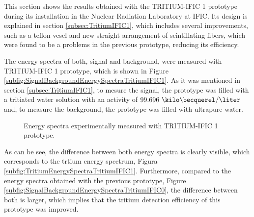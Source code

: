 This section shows the results obtained with the TRITIUM-IFIC 1 prototype  during its installation in the Nuclear Radiation Laboratory at IFIC. Its design is explained in section \ref{subsec:TritiumIFIC1}, which includes several improvements, such as a teflon vesel and new straight arrangement of scintillating fibers, which were found to be a problems in the previous prototype, reducing its efficiency.

The energy spectra of both, signal and background, were measured with TRITIUM-IFIC 1 prototype, which is shown in Figure \ref{subfig:SignalBackgroundEnergySpectraTritiumIFIC1}. As it was mentioned in section \ref{subsec:TritiumIFIC1}, to mesure the signal, the prototype was filled with a tritiated water solution with an activity of $99.696~\kilo\becquerel/\liter$ and, to measure the background, the prototype was filled with ultrapure water.

\begin{figure}[h]
 \centering
   \newline
 \caption{Energy spectra experimentally measured with TRITIUM-IFIC 1 prototype.}
 \label{fig:EnergySpectraTRITIUMIFIC1}
\end{figure}


As can be see, the difference between both energy spectra is clearly visible, which corresponds to the trtium energy spectrum, Figura \ref{subfig:TritiumEnergySpectraTritiumIFIC1}. Furthermore, compared to the energy spectra obtained with the previous prototype, Figure \ref{subfig:SignalBackgroundEnergySpectraTritiumIFIC0}, the difference between both is larger, which implies that the tritium detection efficiency of this prototype was improved.

